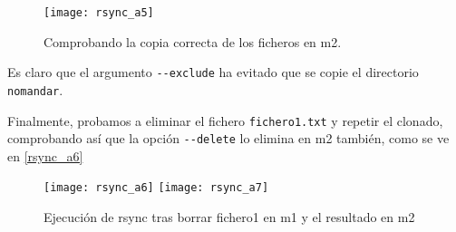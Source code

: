 \begin{figure}
\begin{center}
\caption{Comprobando la copia correcta de los ficheros en m2.}
\label{rsync_a5}
\texttt{[image: rsync\_a5]}
\end{center}
\end{figure}

Es claro que el argumento \verb|--exclude| ha evitado que se copie el directorio \verb|nomandar|.

Finalmente, probamos a eliminar el fichero \verb|fichero1.txt| y repetir el clonado, comprobando así que la opción \verb|--delete| lo elimina en m2 también, como se ve en \eqref{rsync_a6}

\begin{figure}
\begin{center}
\caption{Ejecución de rsync tras borrar fichero1 en m1 y el resultado en m2}
\label{rsync_a6}
\texttt{[image: rsync\_a6]}
\texttt{[image: rsync\_a7]}
\end{center}
\end{figure}







